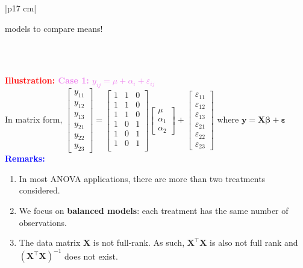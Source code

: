 \documentclass[a4paper,11pt]{article}
\begin{document}
\begin{longtable}{|p{17 cm}|}
\begin{minipage}{\linewidth}
\begin{enumerate}
{models to compare means!}
\end{enumerate} \\
\end{minipage} \\
\hline
\textbf{\textcolor{red}{Illustration: }\textcolor{violet}{Case 1: $y_{ij} = \mu+\alpha_i+\varepsilon_{ij}$}}\\
In matrix form,
$\begin{bmatrix}
    y_{11} \\ 
    y_{12} \\ 
    y_{13} \\ 
    y_{21} \\ 
    y_{22} \\ 
    y_{23}
\end{bmatrix} = \begin{bmatrix}
    1 & 1 & 0 \\
    1 & 1 & 0 \\
    1 & 1 & 0 \\
    1 & 0 & 1 \\
    1 & 0 & 1 \\
    1 & 0 & 1 \\
\end{bmatrix} \begin{bmatrix}
    \mu \\
    \alpha_1 \\
    \alpha_2 
\end{bmatrix} + \begin{bmatrix}
    \varepsilon_{11} \\
    \varepsilon_{12} \\
    \varepsilon_{13} \\
    \varepsilon_{21} \\
    \varepsilon_{22} \\
    \varepsilon_{23} 
\end{bmatrix}$
\quad where $\mathbf{y}=\mathbf{X}\boldsymbol{\beta}+\boldsymbol{\varepsilon}$ \\
\hline 
\newpage
\hline
\textbf{\textcolor{blue}{Remarks:}}\\
\begin{minipage}{\linewidth} 
\begin{enumerate}[noitemsep, topsep=0pt]
    \item In most ANOVA applications, there are more than two treatments considered.
    \item We focus on \textbf{balanced models}: each treatment has the same number of observations.
    \item The data matrix $\mathbf{X}$ is not full-rank. As such, $\mathbf{X}^{\top}\mathbf{X}$ is also not full rank and $(\mathbf{X}^{\top}\mathbf{X})^{-1}$ does not exist.

\end{enumerate}
\end{minipage}
\end{longtable}
\end{document}
